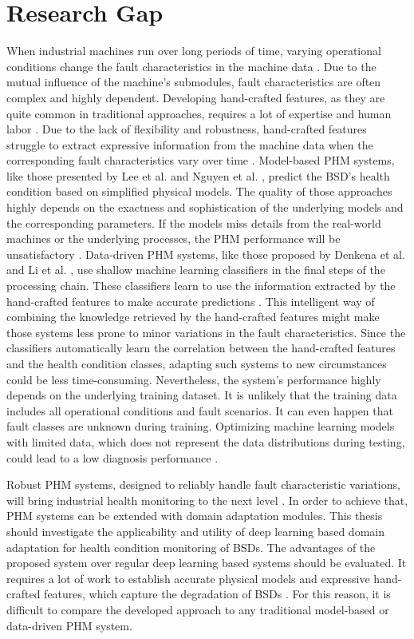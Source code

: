 \section{Research Gap}\label{ch:research_gap}
When industrial machines run over long periods of time, varying operational conditions change the fault characteristics in the machine data \cite{AZAMFAR2020103932}. Due to the mutual influence of the machine's submodules, fault characteristics are often complex and highly dependent. Developing hand-crafted features, as they are quite common in traditional approaches, requires a lot of expertise and human labor \cite{ZHAO2019213}. Due to the lack of flexibility and robustness, hand-crafted features struggle to extract expressive information from the machine data when the corresponding fault characteristics vary over time \cite{ZHAO2019213}.
Model-based PHM systems, like those presented by Lee et al. \cite{Lee2015} and Nguyen et al. \cite{NGUYEN2019}, predict the BSD's health condition based on simplified physical models. The quality of those approaches highly depends on the exactness and sophistication of the underlying models and the corresponding parameters. If the models miss details from the real-world machines or the underlying processes, the PHM performance will be unsatisfactory \cite{ZHAO2019213}.
Data-driven PHM systems, like those proposed by Denkena et al. \cite{Denkena2021} and Li et al. \cite{LiPin2018}, use shallow machine learning classifiers in the final steps of the processing chain. These classifiers learn to use the information extracted by the hand-crafted features to make accurate predictions \cite{ZHAO2019213}. This intelligent way of combining the knowledge retrieved by the hand-crafted features might make those systems less prone to minor variations in the fault characteristics. Since the classifiers automatically learn the correlation between the hand-crafted features and the health condition classes, adapting such systems to new circumstances could be less time-consuming. Nevertheless, the system's performance highly depends on the underlying training dataset. It is unlikely that the training data includes all operational conditions and fault scenarios. It can even happen that fault classes are unknown during training. Optimizing machine learning models with limited data, which does not represent the data distributions during testing, could lead to a low diagnosis performance \cite{AZAMFAR2020103932}.

Robust PHM systems, designed to reliably handle fault characteristic variations, will bring industrial health monitoring to the next level \cite{Michau2017}. In order to achieve that, PHM systems can be extended with domain adaptation modules. This thesis should investigate the applicability and utility of deep learning based domain adaptation for health condition monitoring of BSDs. The advantages of the proposed system over regular deep learning based systems should be evaluated. It requires a lot of work to establish accurate physical models and expressive hand-crafted features, which capture the degradation of BSDs \cite{ZHAO2019213}. For this reason, it is difficult to compare the developed approach to any traditional model-based or data-driven PHM system.

